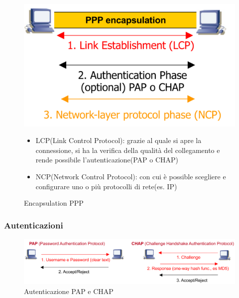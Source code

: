     \begin{figure}[htbp]
        \centering
        \begin{minipage}{0.45\textwidth}
            \includegraphics[width=\linewidth]{images/pppencapsulation.png}
            \caption{Encapsulation PPP}
            \label{fig:ppp-encapsulation}
        \end{minipage}%
        \hfill
        \begin{minipage}{0.5\textwidth}
            \begin{itemize}
                \item LCP(Link Control Protocol): grazie al quale si apre la connessione, si ha la verifica della qualità del collegamento e rende possibile l'autenticazione(PAP o CHAP)
                \item NCP(Network Control Protocol): con cui è possible scegliere e configurare uno o più protocolli di rete(es. IP)
            \end{itemize} 

        \end{minipage}
    \end{figure}
\newpage
    \subsubsection{Autenticazioni}
    \begin{figure}[htbp]
        \centering
        \includegraphics[width=1\textwidth]{images/autenticazionecapchap.png}
        \caption{Autenticazione PAP e CHAP}
        \label{fig:autenticazione-pap-chap}
    \end{figure}
